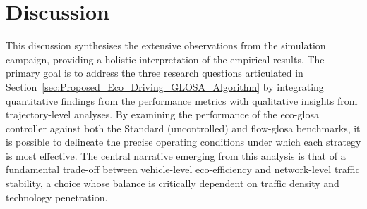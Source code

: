 \section{Discussion}
\label{sec:Results_Discussion}

This discussion synthesises the extensive observations from the simulation campaign, providing a holistic interpretation of the empirical results. The primary goal is to address the three research questions articulated in Section~\vref{sec:Proposed_Eco_Driving_GLOSA_Algorithm} by integrating quantitative findings from the performance metrics with qualitative insights from trajectory-level analyses. By examining the performance of the \ac{eco-glosa} controller against both the Standard (uncontrolled) and \ac{flow-glosa} benchmarks, it is possible to delineate the precise operating conditions under which each strategy is most effective. The central narrative emerging from this analysis is that of a fundamental trade-off between vehicle-level eco-efficiency and network-level traffic stability, a choice whose balance is critically dependent on traffic density and technology penetration.

